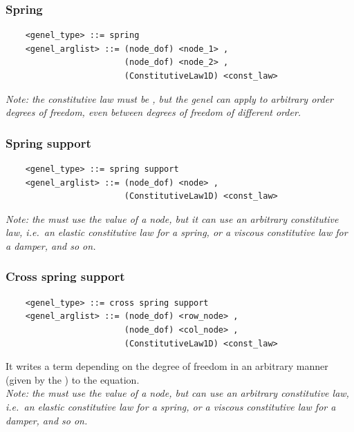 \subsubsection{Spring}
\label{sec:EL:GENEL:SPRING}
\begin{verbatim}
    <genel_type> ::= spring
    <genel_arglist> ::= (node_dof) <node_1> ,
                        (node_dof) <node_2> ,
                        (ConstitutiveLaw1D) <const_law>
\end{verbatim}
{\em 
    Note: the constitutive law must be , but the 
    genel can apply to arbitrary order degrees of freedom, even between degrees 
    of freedom of different order.
}

\subsubsection{Spring support}
\label{sec:EL:GENEL:SPRING-SUPPORT}
\begin{verbatim}
    <genel_type> ::= spring support
    <genel_arglist> ::= (node_dof) <node> ,                      
                        (ConstitutiveLaw1D) <const_law>
\end{verbatim}
{\em
    Note: the  must use the  value of a 
     node, but it can use an arbitrary constitutive law,
    i.e.\ an elastic constitutive law for a spring, or a viscous
    constitutive law for a damper, and so on.
}

\subsubsection{Cross spring support}
\label{sec:EL:GENEL:CROSS-SPRING-SUPPORT}
\begin{verbatim}
    <genel_type> ::= cross spring support
    <genel_arglist> ::= (node_dof) <row_node> ,                      
                        (node_dof) <col_node> ,                      
                        (ConstitutiveLaw1D) <const_law>
\end{verbatim}
It writes a term depending on the  degree of freedom in an
arbitrary manner (given by the ) to the 
 equation. \\
{\em
    Note: the  must use the  value
    of a  node, but can use an arbitrary constitutive law,
    i.e.\ an elastic constitutive law for a spring, or a viscous
    constitutive law for a damper, and so on.
}

